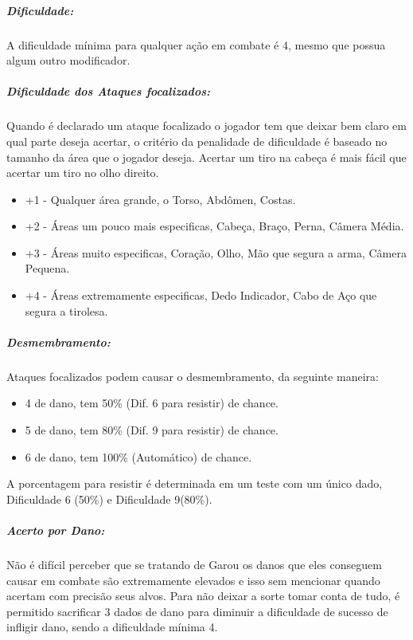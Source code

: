 \subparagraph{\bf Dificuldade:}
A dificuldade mínima para qualquer ação em combate é 4, mesmo que possua algum outro modificador.

\subparagraph{\bf Dificuldade dos Ataques focalizados:}
Quando é declarado um ataque focalizado o jogador tem que deixar bem claro em qual parte deseja acertar, o critério da penalidade de dificuldade é baseado no tamanho da área que o jogador deseja. Acertar um tiro na cabeça é mais fácil que acertar um tiro no olho direito.
\begin{itemize}[noitemsep]
\item +1 - Qualquer área grande, o Torso, Abdômen, Costas.
\item +2 - Áreas um pouco mais especificas, Cabeça, Braço, Perna, Câmera Média.
\item +3 - Áreas muito especificas, Coração, Olho, Mão que segura a arma, Câmera Pequena.
\item +4 - Áreas extremamente especificas, Dedo Indicador, Cabo de Aço que segura a tirolesa.
\end{itemize}

\subparagraph{\bf Desmembramento:}
Ataques focalizados podem causar o desmembramento, da seguinte maneira:
\begin{itemize}[noitemsep]
\item 4 de dano, tem 50\% (Dif. 6 para resistir) de chance.
\item 5 de dano, tem 80\% (Dif. 9 para resistir) de chance.
\item 6 de dano, tem 100\% (Automático) de chance.
\end{itemize}
A porcentagem para resistir é determinada em um teste com um único dado, Dificuldade 6 (50\%) e Dificuldade 9(80\%).

\subparagraph{\bf Acerto por Dano:}
Não é difícil perceber que se tratando de Garou os danos que eles conseguem causar em combate são extremamente elevados e isso sem mencionar quando acertam com precisão seus alvos. Para não deixar a sorte tomar conta de tudo, é permitido sacrificar 3 dados de dano para diminuir a dificuldade de sucesso de infligir dano, sendo a dificuldade mínima 4.

